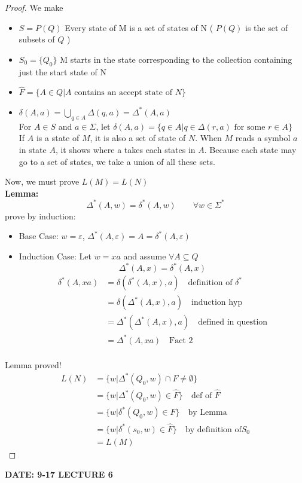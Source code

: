 \documentclass [9 pt]{article}
\theoremstyle{definition}
\begin{document}
\begin{proof}
	We make 
	\begin{itemize}
		\item $S = P(Q)$ Every state of M is a set of states of N ( $P(Q)$ is the set of subsets of $Q$ )
		\item $S_0 = \{Q_0\}$ M starts in the state corresponding to the collection containing just the start state of N
		\item $\widehat{F} = \{A \in Q| A \text{ contains an accept state of } N \}$
		\item $\delta(A, a) = \bigcup_{q\in A} \Delta(q, a) = \Delta^{*} (A, a)$
		\\
		For $A \in S$ and $a \in \Sigma$, let $\delta(A, a) = \{ q \in A| q \in \Delta(r, a) \text{ for some  } r\in A \}$\\
		If $A$ is a state of $M$, it is also a set of state of $N$. When $M$ reads a symbol $a$ in state $A$, it shows where a takes each states in $A$. Because each state may go to a set of states, we take a union of all these sets. 
	\end{itemize}
	Now, we must prove $L(M) = L(N)$\\
	\textbf{Lemma:} $$ \Delta^{*} (A, w) = \delta^{*}(A, w)\quad \quad \forall w \in \Sigma^{*} $$
	prove by induction:
	\begin{itemize}
		\item Base Case: $w = \varepsilon$, $\Delta^*(A, \varepsilon ) = A = \delta^*(A,\varepsilon ) $
		\item Induction Case: Let $w = xa$ and assume $\forall A \subseteq Q$
		$$\Delta^*(A,x) = \delta^*(A, x)$$
		\begin{align*}
			\delta^*(A, xa)
			 &= \delta (\delta^*(A, x), a) \quad \text{definition of $\delta^*$}\\
			 &= \delta (\Delta^*(A, x), a) \quad \text{induction hyp}\\
			 &= \Delta^* (\Delta^*(A, x), a) \quad \text{defined in question}\\
			 &=\Delta^*(A, xa) \quad \text{Fact 2}\\
		\end{align*}
	\end{itemize}
	Lemma proved!
	\begin{align*}
		L(N) 
		&= \{ w | \Delta^{*}(Q_0, w) \cap F \neq \emptyset \}\\
		&= \{ w | \Delta^{*}(Q_0, w) \in \widehat{ F } \}\quad \text{def of } \widehat{F} \\
		&= \{ w | \delta^{*}(Q_0, w) \in \widehat{ F } \}\quad \text{by Lemma} \\
		&= \{ w | \delta^{*}(s_0, w) \in \widehat{ F } \}\quad \text{by definition of} S_0 \\
		&= L(M)
	\end{align*}
\end{proof}
\textbf{DATE: 9-17 LECTURE 6 }
\end{document}
